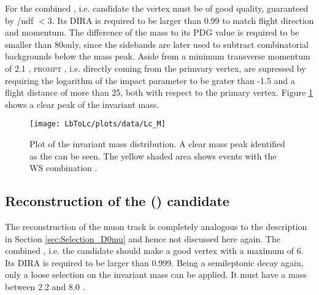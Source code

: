 For the combined \pKpi, i.e. \Lc candidate the vertex must be of good quality, guaranteed by \chisqvtx/ndf $< 3$.
Its DIRA is required to be larger than 0.99 to match flight direction and momentum.
The difference of the \Lc mass to its PDG value is required to be smaller than 80\mev only, since the \Lc sidebands are later used to subtract combinatorial backgrounds below the \Lc mass peak.
Aside from a minimum transverse momentum of 2.1 \gev, \textsc{prompt} \Lc, i.e. \Lc directly coming from the primvary vertex, are supressed by requiring the logarithm of the \Lc impact parameter to be grater than -1.5 and a flight distance \chisq of more than 25, both with respect to the primary vertex.
Figure \ref{fig:plot_Lc_M} shows a clear peak of the invariant \Lc mass.
\begin{figure}[tb]
    \centering
	\texttt{[image: LbToLc/plots/data/Lc\_M]}	
	\caption{Plot of the invariant \pKpi mass distribution. A clear mass peak identified as the \Lc can be seen. The yellow shaded area shows events with the WS combination \Lc\mup.}
	\label{fig:plot_Lc_M}
\end{figure}

\subsection{Reconstruction of the \Lb (\Lc\mun) candidate}
The reconstruction of the muon track is completely analogous to the description in Section \ref{sec:Selection_D0mu} and hence not discussed here again.
The combined \Lc\mun, i.e. the \Lb candidate should make a good vertex with a maximum \chisqvtx of 6.
Its DIRA is required to be larger than 0.999.
Being a semileptonic decay again, only a loose selection on the invariant \Lc\mun mass can be applied.
It must have a mass between 2.2 and 8.0 \gev.

